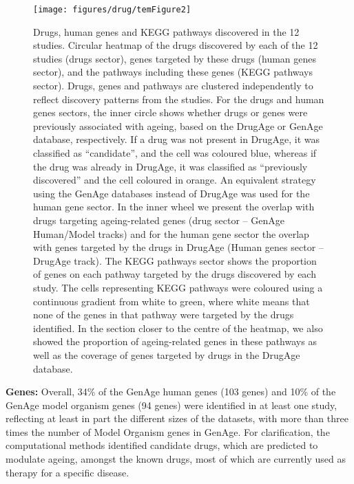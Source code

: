 \documentclass[12pt,twoside]{unicam}
\begin{document}
\begin{figure}

{\centering \texttt{[image: figures/drug/temFigure2]} 

}

\caption[Drugs, human genes and KEGG pathways discovered in the published drug-repurposing studies.]{Drugs, human genes and KEGG pathways discovered in the 12 studies. Circular heatmap of the drugs discovered by each of the 12 studies (drugs sector), genes targeted by these drugs (human genes sector), and the pathways including these genes (KEGG pathways sector). Drugs, genes and pathways are clustered independently to reflect discovery patterns from the studies. For the drugs and human genes sectors, the inner circle shows whether drugs or genes were previously associated with ageing, based on the DrugAge or GenAge database, respectively. If a drug was not present in DrugAge, it was classified as “candidate”, and the cell was coloured blue, whereas if the drug was already in DrugAge, it was classified as “previously discovered” and the cell coloured in orange. An equivalent strategy using the GenAge databases instead of DrugAge was used for the human gene sector. In the inner wheel we present the overlap with drugs targeting ageing-related genes (drug sector – GenAge Human/Model tracks) and for the human gene sector the overlap with genes targeted by the drugs in DrugAge (Human genes sector – DrugAge track). The KEGG pathways sector shows the proportion of genes on each pathway targeted by the drugs discovered by each study. The cells representing KEGG pathways were coloured using a continuous gradient from white to green, where white means that none of the genes in that pathway were targeted by the drugs identified. In the section closer to the centre of the heatmap, we also showed the proportion of ageing-related genes in these pathways as well as the coverage of genes targeted by drugs in the DrugAge database.}\label{fig:temrevFig2}
\end{figure}

\textbf{Genes:} Overall, 34\% of the GenAge human genes (103 genes) and 10\% of the GenAge model organism genes (94 genes) were identified in at least one study, reflecting at least in part the different sizes of the datasets, with more than three times the number of Model Organism genes in GenAge. For clarification, the computational methods identified candidate drugs, which are predicted to modulate ageing, amongst the known drugs, most of which are currently used as therapy for a specific disease.
\end{document}
